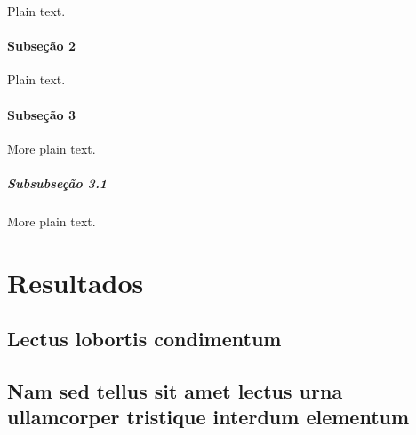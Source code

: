 \documentclass[12pt,openright,twoside,a4paper]{abntex2}
\begin{document}
Plain text.

\lipsum[6-10]

\subsection{Subseção 2}

Plain text.

\lipsum[11-15]

\subsection{Subseção 3}

More plain text.

\lipsum[16-17]

\subsubsection{Subsubseção 3.1}

More plain text.

\lipsum[18-20]

\part{Resultados}

\chapter{Lectus lobortis condimentum}

\lipsum[21-23]

\chapter{Nam sed tellus sit amet lectus urna ullamcorper tristique interdum
elementum}

\lipsum[24]


\postextual

\end{document}
